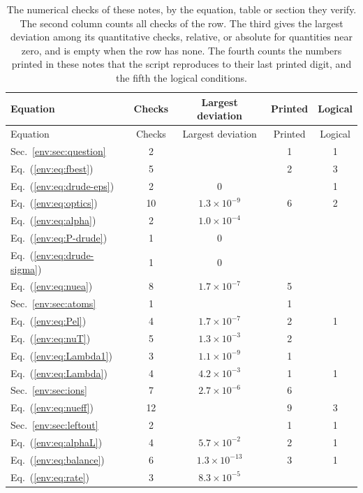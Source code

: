 \begin{longtable}{L{4.0cm}cccc}
\caption{The numerical checks of these notes, by the equation, table or section they verify. The second column counts all checks of the row. The third gives the largest deviation among its quantitative checks, relative, or absolute for quantities near zero, and is empty when the row has none. The fourth counts the numbers printed in these notes that the script reproduces to their last printed digit, and the fifth the logical conditions.}\label{env:tab:checks}\\
\toprule
Equation & Checks & Largest deviation & Printed & Logical\\
\midrule
\endfirsthead
\toprule
Equation & Checks & Largest deviation & Printed & Logical\\
\midrule
\endhead
\bottomrule
\endfoot
Sec.~\ref*{env:sec:question} & 2 &  & 1 & 1\\
Eq.~(\ref*{env:eq:fbest}) & 5 &  & 2 & 3\\
Eq.~(\ref*{env:eq:drude-eps}) & 2 & $0$ &  & 1\\
Eq.~(\ref*{env:eq:optics}) & 10 & $1.3\times10^{-9}$ & 6 & 2\\
Eq.~(\ref*{env:eq:alpha}) & 2 & $1.0\times10^{-4}$ &  & \\
Eq.~(\ref*{env:eq:P-drude}) & 1 & $0$ &  & \\
Eq.~(\ref*{env:eq:drude-sigma}) & 1 & $0$ &  & \\
Eq.~(\ref*{env:eq:nuea}) & 8 & $1.7\times10^{-7}$ & 5 & \\
Sec.~\ref*{env:sec:atoms} & 1 &  & 1 & \\
Eq.~(\ref*{env:eq:Pel}) & 4 & $1.7\times10^{-7}$ & 2 & 1\\
Eq.~(\ref*{env:eq:nuT}) & 5 & $1.3\times10^{-3}$ & 2 & \\
Eq.~(\ref*{env:eq:Lambda1}) & 3 & $1.1\times10^{-9}$ & 1 & \\
Eq.~(\ref*{env:eq:Lambda}) & 4 & $4.2\times10^{-3}$ & 1 & 1\\
Sec.~\ref*{env:sec:ions} & 7 & $2.7\times10^{-6}$ & 6 & \\
Eq.~(\ref*{env:eq:nueff}) & 12 &  & 9 & 3\\
Sec.~\ref*{env:sec:leftout} & 2 &  & 1 & 1\\
Eq.~(\ref*{env:eq:alphaL}) & 4 & $5.7\times10^{-2}$ & 2 & 1\\
Eq.~(\ref*{env:eq:balance}) & 6 & $1.3\times10^{-13}$ & 3 & 1\\
Eq.~(\ref*{env:eq:rate}) & 3 & $8.3\times10^{-5}$ &  & \\

\end{longtable}
